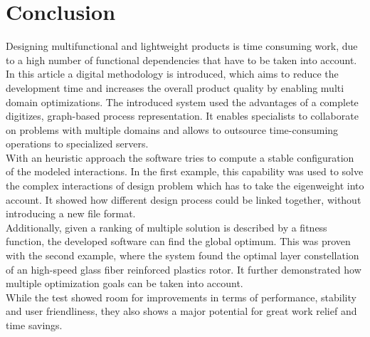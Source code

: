 \section{Conclusion}
Designing multifunctional and lightweight products is time consuming work, due to a high number of functional dependencies that have to be taken into account.
In this article a digital methodology is introduced, 
which aims to reduce the development time and 
increases the overall product quality by enabling multi domain optimizations.
The introduced system used the advantages of a complete digitizes, graph-based process representation.
It enables specialists to collaborate on problems with multiple domains and allows to outsource time-consuming operations to specialized servers.\\
With an heuristic approach the software tries to compute a stable configuration of the modeled interactions.
In the first example, this capability was used to solve the complex interactions of design problem which has to take the eigenweight into account.
It showed how different design process could be linked together, without introducing a new file format.\\
Additionally, given a ranking of multiple solution is described by a fitness function, the developed software can find the global optimum.
This was proven with the second example, where the system found the optimal layer constellation of an high-speed glass fiber reinforced plastics rotor.
It further demonstrated how multiple optimization goals can be taken into account.\\
While the test showed room for improvements in terms of performance, stability and user friendliness,
they also shows a major potential for great work relief and time savings.
